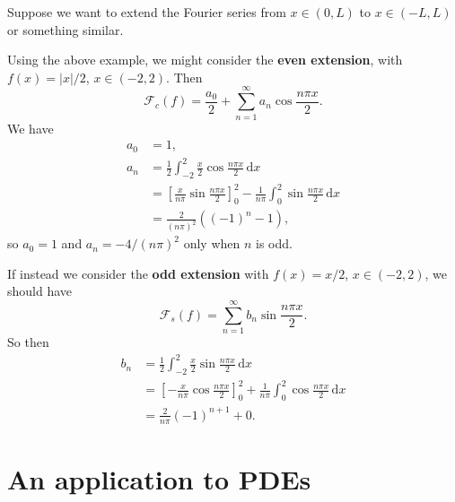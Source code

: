 \documentclass[letter-paper]{tufte-book}
\newenvironment{example}[1][Example]{\begin{trivlist}
\item[\hskip \labelsep {\bfseries #1}]}{\end{trivlist}}
\newcommand\Def[1]{\textbf{#1}}
\begin{document}
Suppose we want to extend the Fourier series from $x\in(0,L)$ to $x\in(-L,L)$ or
something similar.
\begin{example}
  Using the above example, we might consider the \Def{even extension},
  with $f(x)=|x|/2$, $x\in(-2,2)$. Then
  \begin{equation*}
    \mathcal{F}_c(f) = \frac{a_0}{2}+ \sum_{n=1}^\infty a_n\cos\frac{n\pi x}{2}.
  \end{equation*}
  We have
  \begin{align*}
    a_0 &= 1, \\
    a_n &= \frac{1}{2} \int_{-2}^2 \frac{x}{2}\cos\frac{n\pi x}{2}\, \mathrm{d}x \\
      &= \left[\frac{x}{n\pi}\sin\frac{n\pi x}{2}\right]_0^2 - \frac{1}{n\pi}\int_0^2 \sin\frac{n\pi x}{2}\, \mathrm{d}x \\
      &= \frac{2}{(n\pi)^2}((-1)^n-1),
  \end{align*}
  so $a_0=1$ and $a_n=-4/(n\pi)^2$ only when $n$ is odd.
\end{example}
\begin{example}
  If instead we consider the \Def{odd extension} with $f(x)=x/2$,
  $x\in(-2,2)$, we should have
  \begin{equation*}
    \mathcal{F}_s(f) = \sum_{n=1}^\infty b_n\sin\frac{n\pi x}{2}.
  \end{equation*}
  So then
  \begin{align*}
    b_n &= \frac{1}{2} \int_{-2}^2 \frac{x}{2}\sin\frac{n\pi x}{2}\, \mathrm{d}x \\
      &= \left[-\frac{x}{n\pi}\cos\frac{n\pi x}{2}\right]_0^2 + \frac{1}{n\pi}\int_0^2 \cos\frac{n\pi x}{2}\, \mathrm{d}x\\
      &= \frac{2}{n\pi}(-1)^{n+1} + 0.
  \end{align*}
\end{example}


\section{An application to PDEs}
\end{document}
